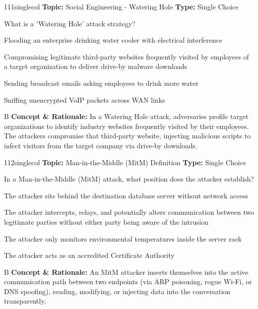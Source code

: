 \begin{qcard}{111}{singlecol}
\textcolor{darkslate!75}{\small\textbf{Topic:} Social Engineering - Watering Hole \hfill \textbf{Type:} Single Choice}\vspace{0.4em}\par
What is a 'Watering Hole' attack strategy?
\begin{qoptions}
\item Flooding an enterprise drinking water cooler with electrical interference
\item Compromising legitimate third-party websites frequently visited by employees of a target organization to deliver drive-by malware downloads
\item Sending broadcast emails asking employees to drink more water
\item Sniffing unencrypted VoIP packets across WAN links
\end{qoptions}
\end{qcard}
\nopagebreak
\begin{explainbox}{B}
\textbf{Concept \& Rationale:} In a Watering Hole attack, adversaries profile target organizations to identify industry websites frequently visited by their employees. The attackers compromise that third-party website, injecting malicious scripts to infect visitors from the target company via drive-by downloads.
\end{explainbox}

\begin{qcard}{112}{singlecol}
\textcolor{darkslate!75}{\small\textbf{Topic:} Man-in-the-Middle (MitM) Definition \hfill \textbf{Type:} Single Choice}\vspace{0.4em}\par
In a Man-in-the-Middle (MitM) attack, what position does the attacker establish?
\begin{qoptions}
\item The attacker sits behind the destination database server without network access
\item The attacker intercepts, relays, and potentially alters communication between two legitimate parties without either party being aware of the intrusion
\item The attacker only monitors environmental temperatures inside the server rack
\item The attacker acts as an accredited Certificate Authority
\end{qoptions}
\end{qcard}
\nopagebreak
\begin{explainbox}{B}
\textbf{Concept \& Rationale:} An MitM attacker inserts themselves into the active communication path between two endpoints (via ARP poisoning, rogue Wi-Fi, or DNS spoofing), reading, modifying, or injecting data into the conversation transparently.
\end{explainbox}

